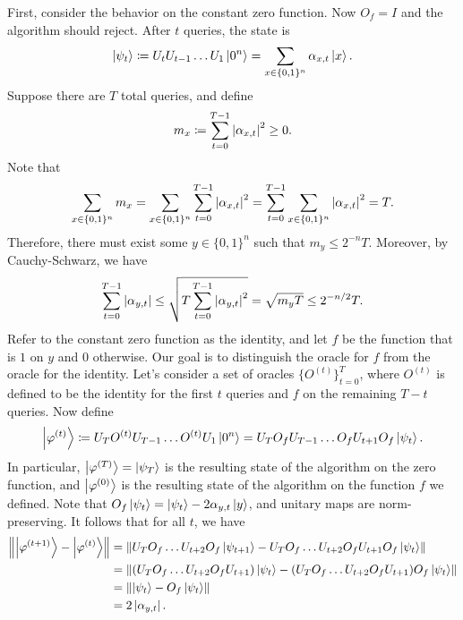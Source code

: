 \documentclass[a4paper,draft]{article}
\begin{document}
First, consider the behavior on the constant zero function. Now $O_f = I$
and the algorithm should reject. After $t$ queries, the state is
\[
  \left\lvert \psi_t\right\rangle
  \coloneq U_t U_{t - 1} \dots U_1 \left\lvert 0^n\right\rangle
  = \sum_{x \in \{0, 1\}^n} \alpha_{x, t} \left\lvert x\right\rangle.
\]
Suppose there are $T$ total queries, and define
\[
  m_x \coloneq \sum_{t = 0}^{T - 1} \left\lvert \alpha_{x, t}\right\rvert^2 \geq 0.
\]
Note that
\[
  \sum_{x \in \{0, 1\}^n} m_x
  = \sum_{x \in \{0, 1\}^n} \sum_{t = 0}^{T - 1} \left\lvert \alpha_{x, t}\right\rvert^2
  = \sum_{t = 0}^{T - 1} \sum_{x \in \{0, 1\}^n}  \left\lvert \alpha_{x, t}\right\rvert^2
  = T.
\]
Therefore, there must exist some $y \in \{0, 1\}^n$ such that $m_y \leq
  2^{-n} T$. Moreover, by Cauchy-Schwarz, we have
\[
  \sum_{t = 0}^{T - 1} \left\lvert \alpha_{y, t}\right\rvert
  \leq \sqrt{T \sum_{t = 0}^{T - 1} \left\lvert \alpha_{y, t}\right\rvert^2}
  = \sqrt{m_y T}
  \leq 2^{-n / 2} T.
\]
Refer to the constant zero function as the identity, and let $f$ be the
  function that is $1$ on $y$ and $0$ otherwise. Our goal is to
  distinguish the oracle for $f$ from the oracle for the identity. Let's
  consider a set of oracles $\{ O^{(t)} \}_{t = 0}^T$, where $O^{(t)}$ is
  defined to be the identity for the first $t$ queries and $f$ on the
  remaining $T - t$ queries. Now define
\[
  \left\lvert \varphi^{(t)}\right\rangle
  \coloneq U_T O^{(t)} U_{T - 1} \dots O^{(t)} U_1 \left\lvert 0^n\right\rangle
  = U_T O_f U_{T - 1} \dots O_f U_{t + 1} O_f \left\lvert \psi_t\right\rangle.
\]
In particular, $\left\lvert \varphi^{(T)}\right\rangle = \left\lvert \psi_T\right\rangle$ is the resulting
  state of the algorithm on the zero function, and $\left\lvert \varphi^{(0)}\right\rangle$ is
  the resulting state of the algorithm on the function $f$ we defined.
  Note that $O_f \left\lvert \psi_t\right\rangle = \left\lvert \psi_t\right\rangle - 2 \alpha_{y, t}
  \left\lvert y\right\rangle$, and unitary maps are norm-preserving. It follows that for all
  $t$, we have
\begin{align*}
  \left\lVert \left\lvert \varphi^{(t + 1)}\right\rangle - \left\lvert \varphi^{(t)}\right\rangle\right\rVert
   & = \left\lVert U_T O_f \dots U_{t + 2} O_f \left\lvert \psi_{t + 1}\right\rangle
         - U_T O_f \dots U_{t + 2} O_f U_{t + 1} O_f \left\lvert \psi_t\right\rangle\right\rVert   \\
   & = \left\lVert (U_T O_f \dots U_{t + 2} O_f U_{t + 1}) \left\lvert \psi_t\right\rangle
         - (U_T O_f \dots U_{t + 2} O_f U_{t + 1}) O_f \left\lvert \psi_t\right\rangle\right\rVert \\
   & = \left\lVert \left\lvert \psi_t\right\rangle - O_f \left\lvert \psi_t\right\rangle\right\rVert                       \\
   & = 2 \left\lvert \alpha_{y, t}\right\rvert.
\end{align*}
\end{document}
